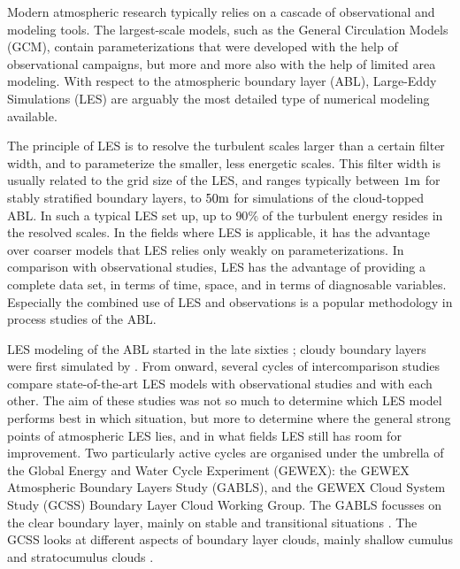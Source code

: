 \introduction

Modern atmospheric research typically relies on a cascade of observational and modeling tools. The largest-scale models, such as the General Circulation Models (GCM), contain parameterizations that were developed with the help of observational campaigns, but more and more also with the help of limited area modeling. With respect to the atmospheric boundary layer (ABL), Large-Eddy Simulations (LES) are arguably the most detailed type of numerical modeling available. 

The principle of LES is to resolve the turbulent scales larger than a certain filter width, and to parameterize the smaller, less energetic scales. This filter width is usually related to the grid size of the LES, and ranges typically between $1\mathrm{m}$ for stably stratified boundary layers, to $50\mathrm{m}$ for simulations of the cloud-topped ABL. In such a typical LES set up, up to $90\%$ of the turbulent energy resides in the resolved scales.  In the fields where LES is applicable, it has the advantage over coarser models that LES relies only weakly on parameterizations. In comparison with observational studies, LES has the advantage of providing a complete data set, in terms of time, space, and in terms of diagnosable variables. Especially the combined use of LES and observations is a popular methodology in process studies of the ABL.

LES modeling  of the ABL started in the late sixties \cite[e.g.,][]{lilly1967,deardorff1972}; cloudy boundary layers were first  simulated by \citet{sommeria1976}.  From \citet{nieuwstadt1986} onward, several cycles of intercomparison studies compare state-of-the-art LES models with observational studies and with each other. The aim of these studies was not so much to determine which LES model performs best in which situation, but more to determine where the general strong points of atmospheric LES lies, and in what fields LES still has room for improvement. Two particularly active cycles are organised under the umbrella of the Global Energy and Water Cycle Experiment (GEWEX): the GEWEX Atmospheric Boundary Layers Study (GABLS), and the GEWEX Cloud System Study (GCSS) Boundary Layer Cloud Working Group. The GABLS focusses on the clear boundary layer, mainly on stable and transitional situations \citep{holtslag2006,beare2006,basu2008}. The GCSS looks at different aspects of boundary layer clouds, mainly shallow cumulus and stratocumulus clouds \citep{bretherton1999,bretherton1999b,duynkerke1999,duynkerke2004,brown2002,siebesma2003a,stevens2001,stevens2005,ackerman2009,zanteninpreparation}. 

